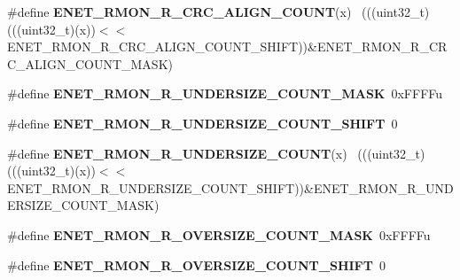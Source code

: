 \begin{DoxyCompactItemize}
\item 
\hypertarget{group___e_n_e_t___register___masks_gad7fa25694f239a8d934186d489646088}{}\#define {\bfseries E\+N\+E\+T\+\_\+\+R\+M\+O\+N\+\_\+\+R\+\_\+\+C\+R\+C\+\_\+\+A\+L\+I\+G\+N\+\_\+\+C\+O\+U\+N\+T}(x)                  ~(((uint32\+\_\+t)(((uint32\+\_\+t)(x))$<$$<$E\+N\+E\+T\+\_\+\+R\+M\+O\+N\+\_\+\+R\+\_\+\+C\+R\+C\+\_\+\+A\+L\+I\+G\+N\+\_\+\+C\+O\+U\+N\+T\+\_\+\+S\+H\+I\+F\+T))\&E\+N\+E\+T\+\_\+\+R\+M\+O\+N\+\_\+\+R\+\_\+\+C\+R\+C\+\_\+\+A\+L\+I\+G\+N\+\_\+\+C\+O\+U\+N\+T\+\_\+\+M\+A\+S\+K)\label{group___e_n_e_t___register___masks_gad7fa25694f239a8d934186d489646088}

\item 
\hypertarget{group___e_n_e_t___register___masks_ga8a24b45ac31e9bb082d18e378e634dad}{}\#define {\bfseries E\+N\+E\+T\+\_\+\+R\+M\+O\+N\+\_\+\+R\+\_\+\+U\+N\+D\+E\+R\+S\+I\+Z\+E\+\_\+\+C\+O\+U\+N\+T\+\_\+\+M\+A\+S\+K}~0x\+F\+F\+F\+Fu\label{group___e_n_e_t___register___masks_ga8a24b45ac31e9bb082d18e378e634dad}

\item 
\hypertarget{group___e_n_e_t___register___masks_gaea02d213bcae36ffe06ff62931d8af0d}{}\#define {\bfseries E\+N\+E\+T\+\_\+\+R\+M\+O\+N\+\_\+\+R\+\_\+\+U\+N\+D\+E\+R\+S\+I\+Z\+E\+\_\+\+C\+O\+U\+N\+T\+\_\+\+S\+H\+I\+F\+T}~0\label{group___e_n_e_t___register___masks_gaea02d213bcae36ffe06ff62931d8af0d}

\item 
\hypertarget{group___e_n_e_t___register___masks_gae380f4ebe1cba5a048dfadb1f4dd6ebb}{}\#define {\bfseries E\+N\+E\+T\+\_\+\+R\+M\+O\+N\+\_\+\+R\+\_\+\+U\+N\+D\+E\+R\+S\+I\+Z\+E\+\_\+\+C\+O\+U\+N\+T}(x)                  ~(((uint32\+\_\+t)(((uint32\+\_\+t)(x))$<$$<$E\+N\+E\+T\+\_\+\+R\+M\+O\+N\+\_\+\+R\+\_\+\+U\+N\+D\+E\+R\+S\+I\+Z\+E\+\_\+\+C\+O\+U\+N\+T\+\_\+\+S\+H\+I\+F\+T))\&E\+N\+E\+T\+\_\+\+R\+M\+O\+N\+\_\+\+R\+\_\+\+U\+N\+D\+E\+R\+S\+I\+Z\+E\+\_\+\+C\+O\+U\+N\+T\+\_\+\+M\+A\+S\+K)\label{group___e_n_e_t___register___masks_gae380f4ebe1cba5a048dfadb1f4dd6ebb}

\item 
\hypertarget{group___e_n_e_t___register___masks_ga3d8f160025d5d600fd7206e6fc762fc1}{}\#define {\bfseries E\+N\+E\+T\+\_\+\+R\+M\+O\+N\+\_\+\+R\+\_\+\+O\+V\+E\+R\+S\+I\+Z\+E\+\_\+\+C\+O\+U\+N\+T\+\_\+\+M\+A\+S\+K}~0x\+F\+F\+F\+Fu\label{group___e_n_e_t___register___masks_ga3d8f160025d5d600fd7206e6fc762fc1}

\item 
\hypertarget{group___e_n_e_t___register___masks_ga3e279c65a9e7d91eef6b4f228c028f47}{}\#define {\bfseries E\+N\+E\+T\+\_\+\+R\+M\+O\+N\+\_\+\+R\+\_\+\+O\+V\+E\+R\+S\+I\+Z\+E\+\_\+\+C\+O\+U\+N\+T\+\_\+\+S\+H\+I\+F\+T}~0\label{group___e_n_e_t___register___masks_ga3e279c65a9e7d91eef6b4f228c028f47}


\end{DoxyCompactItemize}
